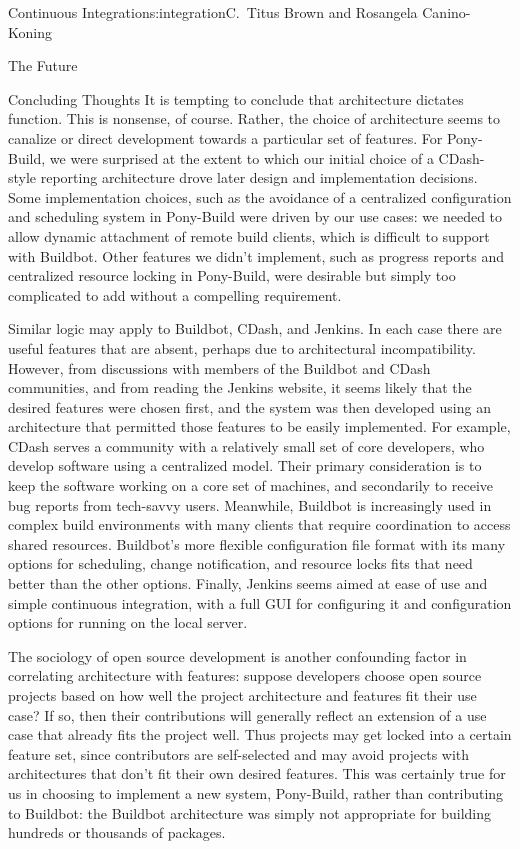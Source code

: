 \begin{aosachapter}{Continuous Integration}{s:integration}{C.\ Titus Brown and Rosangela Canino-Koning}
\begin{aosasect1}{The Future}
\begin{aosasect2}{Concluding Thoughts}
It is tempting to conclude that architecture dictates function. This
is nonsense, of course. Rather, the choice of architecture seems to
canalize or direct development towards a particular set of
features. For Pony-Build, we were surprised at the extent to which our
initial choice of a CDash-style reporting architecture drove later
design and implementation decisions. Some implementation choices, such
as the avoidance of a centralized configuration and scheduling system
in Pony-Build were driven by our use cases: we needed to allow dynamic
attachment of remote build clients, which is difficult to support with
Buildbot. Other features we didn't implement, such as progress reports
and centralized resource locking in Pony-Build, were desirable but
simply too complicated to add without a compelling requirement.

Similar logic may apply to Buildbot, CDash, and Jenkins. In each case
there are useful features that are absent, perhaps due to
architectural incompatibility. However, from discussions with members
of the Buildbot and CDash communities, and from reading the Jenkins
website, it seems likely that the desired features were chosen first,
and the system was then developed using an architecture that permitted
those features to be easily implemented. For example, CDash serves a
community with a relatively small set of core developers, who develop
software using a centralized model. Their primary consideration is to
keep the software working on a core set of machines, and secondarily
to receive bug reports from tech-savvy users. Meanwhile, Buildbot is
increasingly used in complex build environments with many clients that
require coordination to access shared resources. Buildbot's more
flexible configuration file format with its many options for
scheduling, change notification, and resource locks fits that need
better than the other options. Finally, Jenkins seems aimed at ease of
use and simple continuous integration, with a full GUI for configuring
it and configuration options for running on the local server.

The sociology of open source development is another confounding factor
in correlating architecture with features: suppose developers choose
open source projects based on how well the project architecture and
features fit their use case?  If so, then their contributions will
generally reflect an extension of a use case that already fits the
project well. Thus projects may get locked into a certain feature set,
since contributors are self-selected and may avoid projects with
architectures that don't fit their own desired features. This was
certainly true for us in choosing to implement a new system,
Pony-Build, rather than contributing to Buildbot: the Buildbot
architecture was simply not appropriate for building hundreds or
thousands of packages.


\end{aosasect2}
\end{aosasect1}
\end{aosachapter}
